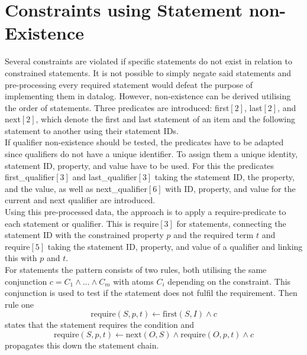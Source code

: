 \documentclass[hyperref,bachelorofscience,fleqn]{cgvpub}
\begin{document}
 \section{Constraints using Statement non-Existence}\label{sec_constraints_using_statement_non}
Several constraints are violated if specific statements do not exist in relation to constrained statements. It is not possible to simply negate said statements and pre-processing every required statement would defeat the purpose of implementing them in datalog. However, non-existence can be derived utilising the order of statements. Three predicates are introduced: first\([2]\), last\([2]\), and next\([2]\), which denote the first and last statement of an item and the following statement to another using their statement IDs.\\

If qualifier non-existence should be tested, the predicates have to be adapted since qualifiers do not have a unique identifier. To assign them a unique identity, statement ID, property, and value have to be used. For this the predicates first\_qualifier\([3]\) and last\_qualifier\([3]\) taking the statement ID, the property, and the value, as well as next\_qualifier\([6]\) with ID, property, and value for the current and next qualifier are introduced.\\

Using this pre-processed data, the approach is to apply a require-predicate to each statement or qualifier. This is require\([3]\) for statements, connecting the statement ID with the constrained property \(p\) and the required term \(t\) and require\([5]\) taking the statement ID, property, and value of a qualifier and linking this with \(p\) and \(t\).\\

For statements the pattern consists of two rules, both utilising the same conjunction \(c = C_1 \wedge \ldots \wedge C_m\) with atoms \(C_i\) depending on the constraint. This conjunction is used to test if the statement does not fulfil the requirement. Then rule one
\begin{equation*}
\text{require}(S, p, t) \leftarrow \text{first}(S, I) \wedge c
\end{equation*}
states that the statement requires the condition and
\begin{equation*}
\text{require}(S, p, t) \leftarrow \text{next}(O, S) \wedge \text{require}(O, p, t) \wedge c
\end{equation*}
propagates this down the statement chain.
\end{document}

